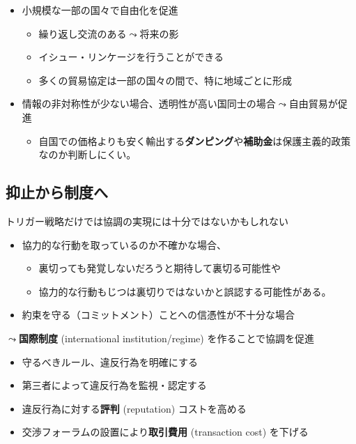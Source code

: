 \documentclass[
  xelatex,
  ja=standard]{bxjsarticle}
\providecommand{\tightlist}{%
  \setlength{\itemsep}{0pt}\setlength{\parskip}{0pt}}\usepackage{longtable,booktabs,array}
\begin{document}
\begin{itemize}
\tightlist
\item
  小規模な一部の国々で自由化を促進\citep{snidal1985}

  \begin{itemize}
  \tightlist
  \item
    繰り返し交流のある\(\leadsto\)将来の影
  \item
    イシュー・リンケージを行うことができる
  \item
    多くの貿易協定は一部の国々の間で、特に地域ごとに形成
  \end{itemize}
\item
  情報の非対称性が少ない場合、透明性が高い国同士の場合\(\leadsto\)自由貿易が促進

  \begin{itemize}
  \tightlist
  \item
    自国での価格よりも安く輸出する\textbf{ダンピング}や\textbf{補助金}は保護主義的政策なのか判断しにくい。
  \end{itemize}
\end{itemize}

\hypertarget{ux6291ux6b62ux304bux3089ux5236ux5ea6ux3078}{%
\subsection{抑止から制度へ}\label{ux6291ux6b62ux304bux3089ux5236ux5ea6ux3078}}

トリガー戦略だけでは協調の実現には十分ではないかもしれない

\begin{itemize}
\tightlist
\item
  協力的な行動を取っているのか不確かな場合、

  \begin{itemize}
  \tightlist
  \item
    裏切っても発覚しないだろうと期待して裏切る可能性や
  \item
    協力的な行動もじつは裏切りではないかと誤認する可能性がある。
  \end{itemize}
\item
  約束を守る（コミットメント）ことへの信憑性が不十分な場合
\end{itemize}

\(\leadsto\)\textbf{国際制度} (international institution/regime)
を作ることで協調を促進

\begin{itemize}
\tightlist
\item
  守るべきルール、違反行為を明確にする
\item
  第三者によって違反行為を監視・認定する
\item
  違反行為に対する\textbf{評判} (reputation) コストを高める
\item
  交渉フォーラムの設置により\textbf{取引費用} (transaction cost)
  を下げる
\end{itemize}
\end{document}
